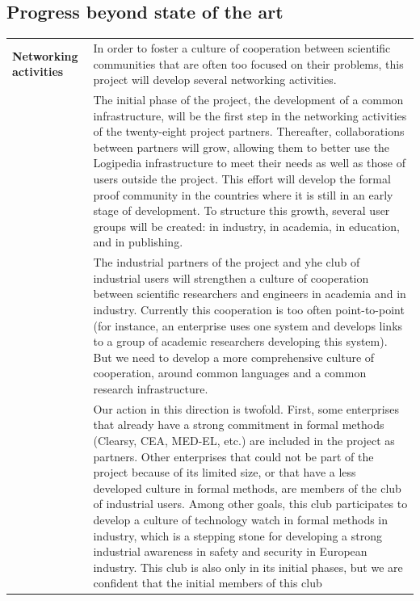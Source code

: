 \subsection*{Progress beyond state of the art}

\begin{longtable}{|p{}|p{}|}
\hline
{\bf Networking activities}
&
In order to foster a culture of cooperation between scientific
communities that are often too focused on their problems, this project
will develop several networking activities.\\
&
\hspace{0.4cm}
The initial phase of the project, the development of a common
infrastructure, will be the first step in the networking activities of
the twenty-eight project partners. Thereafter, collaborations between
partners will grow, allowing them to better use the Logipedia
infrastructure to meet their needs as well as those of users outside
the project. This effort will develop the formal proof community in
the countries where it is still in an early stage of development.  To
structure this growth, several user groups will be created: 
in industry, in academia, in education, and in publishing.\\
&
\hspace{0.4cm}
The industrial partners of the project
and yhe club of industrial users 
will strengthen a culture of cooperation between scientific
researchers and engineers in academia and in industry. Currently this
cooperation is too often point-to-point (for instance, an enterprise uses
one system and develops links to a group of academic researchers
developing this system). But we need to develop a more comprehensive
culture of cooperation, around common languages and a common research
infrastructure.\\
&
\hspace{0.4cm} Our action in this direction is twofold. First, some
enterprises that already have a strong commitment in formal methods
(Clearsy, CEA, MED-EL, etc.) are included in the project as
partners. Other enterprises that could not be part of the project
because of its limited size, or that have a less developed culture in
formal methods, are members of the club of industrial users. Among
other goals, this club participates to develop a culture of
technology watch in formal methods in industry, which is a stepping
stone for developing a strong industrial awareness in safety and
security in European industry. This club is also only in its initial
phases, but we are confident that the initial members of this club

\end{longtable}
